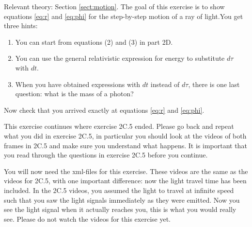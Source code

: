 {\begin{multicols}{2}

Relevant theory: Section \ref{sect:motion}.\newline
The goal of this exercise is to show equations \ref{eq:r} and \ref{eq:phi} for the step-by-step motion of a ray of light.\newline You get three hints:
\begin{enumerate}
\item You can start from equations (2) and (3) in part 2D.
\item You can use the general relativistic expression for energy to substitute $d\tau$ with $dt$.
\item When you have obtained expressions with $dt$ instead of $d\tau$, there is one last question: what is the mass of a photon?
\end{enumerate}
Now check that you arrived exactly at equations \ref{eq:r} and \ref{eq:phi}.

\vspace{0.5cm}



This exercise continues where exercise 2C.5 ended. Please go back and repeat what you did in exercise 2C.5, in particular you should look at the videos of both frames in 2C.5 and make sure you understand what happens. It is important that you read through the questions in exercise 2C.5 before you continue.

You will now need the xml-files for this exercise. These videos are the same as the videos for 2C.5, with one important difference: now the light travel time has been included. In the 2C.5 videos, you assumed the light to travel at infinite speed such that you saw the light signals immediately as they were emitted. Now you see the light signal when it actually reaches you, this is what you would really see. Please do not watch the videos for this exercise yet.


\end{multicols}}
